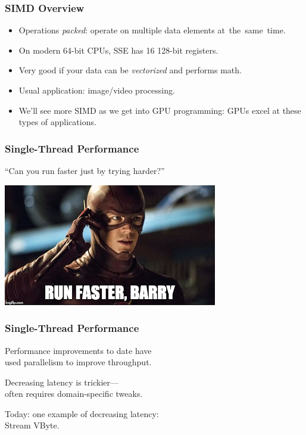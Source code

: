 \begin{frame}
  \frametitle{SIMD Overview}

  
  \begin{itemize}
    \item Operations \emph{packed}: operate on multiple data elements 
      at~the~same~time.
    \vfill
    \item On modern 64-bit CPUs, SSE has 16 128-bit registers.
    \vfill
    \item Very good if your data can be \emph{vectorized} and performs math.
    \vfill
    \item Usual application: image/video processing.
    \vfill
    \item We'll see more SIMD as we get into GPU programming: GPUs excel
       at these types of applications.
  \end{itemize}
  

\end{frame}


\begin{frame}
\frametitle{Single-Thread Performance}

``Can you run faster just by trying harder?''

\begin{center}
\includegraphics[width=0.7\textwidth]{images/theflash.jpg}
\end{center}

\end{frame}


\begin{frame}
\frametitle{Single-Thread Performance}

\begin{changemargin}{2cm}
Performance improvements to date have \\
used parallelism
to improve throughput. 

Decreasing latency is trickier---\\
often requires domain-specific
tweaks. 

Today: one example of decreasing latency: \\
\hspace*{2em} Stream VByte.
\end{changemargin}

\end{frame}


